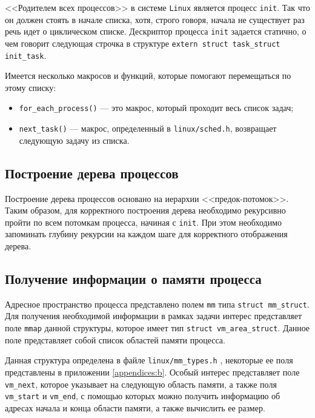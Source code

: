 <<Родителем всех процессов>> в системе \texttt{Linux} является процесс \texttt{init}. Так что он должен стоять в начале списка, хотя, строго говоря, начала не существует раз речь идет о циклическом списке. Дескриптор процесса \texttt{init} задается статично, о чем говорит следующая строчка в структуре \texttt{extern struct task\_struct init\_task}.

Имеется несколько макросов и функций, которые помогают перемещаться по этому списку:

\begin{itemize}
    \item \texttt{for\_each\_process()} --- это макрос, который проходит весь список задач;
    \item \texttt{next\_task()} --- макрос, определенный в \texttt{linux/sched.h}, возвращает 
    следующую задачу из списка.
\end{itemize}


\subsection{Построение дерева процессов}

Построение дерева процессов основано на иерархии <<предок-потомок>>. Таким образом, для корректного построения дерева необходимо рекурсивно пройти по всем потомкам процесса, начиная с \texttt{init}. При этом необходимо запоминать глубину рекурсии на каждом шаге для корректного отображения дерева.


\subsection{Получение информации о памяти процесса}

Адресное пространство процесса представлено полем \texttt{mm} типа \texttt{struct mm\_struct}. Для получения необходимой информации в рамках задачи интерес представляет поле \texttt{mmap} данной структуры, которое имеет тип \texttt{struct vm\_area\_struct}. Данное поле представляет собой список областей памяти процесса.

Данная структура определена в файле \texttt{linux/mm\_types.h} \cite{mm-types}, некоторые ее поля представлены в приложении \ref{appendices:b}. Особый интерес представляет поле \texttt{vm\_next}, которое указывает на следующую область памяти, а также поля \texttt{vm\_start} и \texttt{vm\_end}, с помощью которых можно получить информацию об адресах начала и конца области памяти, а также вычислить ее размер.


